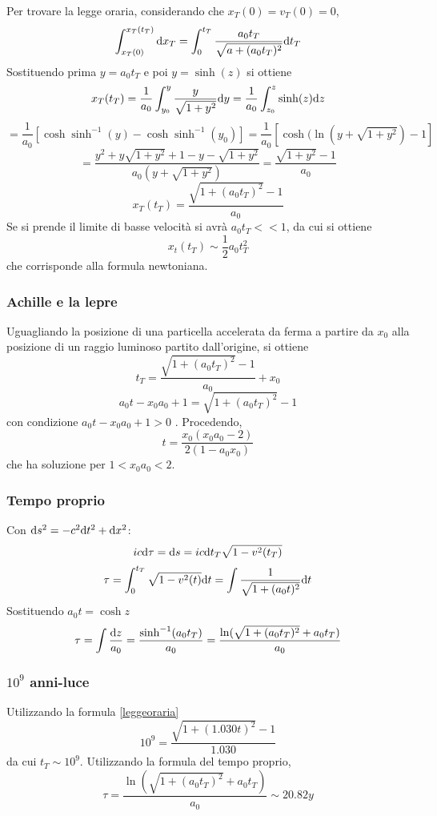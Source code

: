 Per trovare la legge oraria, considerando che \(x_T(0)=v_T(0)=0\),
\[ \int_{x_T(0)}^{x_T(t_T)} \mathrm{d} x_T = \int_0^{t_T} \frac{a_0t_T}{\sqrt{a+(a_0t_T)^2}} \mathrm{d} t_T \]
Sostituendo prima \( y=a_0t_T \) e poi \( y = \sinh(z) \) si ottiene
\[ x_T(t_T) = \frac{1}{a_0} \int_{y_0}^y \frac{y}{\sqrt{1+y^2}} \mathrm{d} y = \frac{1}{a_0} \int_{z_0}^z \sinh(z) \mathrm{d} z \]
\[ = \frac{1}{a_0} [\cosh\sinh^{-1}(y) - \cosh\sinh^{-1}(y_0)]  = \frac{1}{a_0} [\cosh(\ln(y + \sqrt{1+y^2}) -1]\]
\[ = \frac{y^2+y\sqrt{1+y^2}+1-y-\sqrt{1+y^2}}{a_0(y+\sqrt{1+y^2})}  = \frac{\sqrt{1+y^2}-1}{a_0} \]
\begin{equation} \label{leggeoraria}
	x_T(t_T) = \frac{\sqrt{1+(a_0t_T)^2}-1}{a_0} 
\end{equation}
Se si prende il limite di basse velocit\`a si avr\`a \( a_0t_T << 1 \), da cui si ottiene
\[ x_t(t_T) \sim \frac{1}{2}a_0t_T^2 \]
che corrisponde alla formula newtoniana.

\subsubsection{Achille e la lepre}
Uguagliando la posizione di una particella accelerata da ferma a partire da $x_0$ alla posizione di un raggio luminoso partito dall'origine, si ottiene
\[ t_T = \frac{\sqrt{1+(a_0t_T)^2}-1}{a_0} + x_0 \] 
\[ a_0t - x_0a_0 +1 = \sqrt{1+(a_0t_T)^2}-1 \]
con condizione \( a_0t - x_0a_0 +1 >0 \) \todo. Procedendo,
\[ t = \frac{x_0(x_0a_0 -2)}{2(1-a_0x_0)} \]
che ha soluzione per \( 1 < x_0a_0 <2 \).



\subsubsection{Tempo proprio}
Con \(\mathrm{d} s^2 = -c^2\mathrm{d} t^2 + \mathrm{d} x^2 \):
\[ ic\mathrm{d}\tau = \mathrm{d} s = ic\mathrm{d} t_T \sqrt{1-v^2(t_T)} \]
\[ \tau = \int_0^{t_T} \sqrt{1-v^2(t)} \mathrm{d} t = \int \frac{1}{\sqrt{1+(a_0t)^2}} \mathrm{d} t \]
Sostituendo \( a_0t = \cosh z \)
\[ \tau = \int \frac {\mathrm{d} z}{a_0} = \frac{\sinh^{-1}(a_0t_T)}{a_0} = \frac{\ln({\sqrt{1+(a_0t_T)^2}+a_0t_T)}}{a_0}\]

\subsubsection {$10^9$ anni-luce} 
Utilizzando la formula \ref{leggeoraria}
\[ 10^9  = \frac{ \sqrt{1 +(1.030t)^2} -1 }{1.030} \]
da cui \( t_T\sim 10^9 \).
Utilizzando la formula del tempo proprio,
\[ \tau = \frac{ \ln(\sqrt{1+(a_0t_T)^2} + a_0t_T )}{a_0} \sim 20.82 y \]

